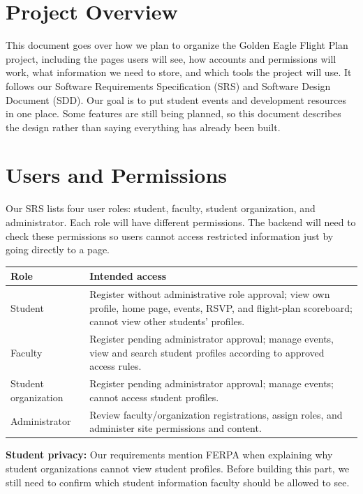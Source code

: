 \newcommand{\documentName}{Project Design Specification}
\newcommand{\shortDocumentName}{PDS}





\firstPageBlock

\newpage %
\section{Project Overview}
This document goes over how we plan to organize the Golden Eagle Flight Plan project, including the pages users will see, how accounts and permissions will work, what information we need to store, and which tools the project will use. It follows our Software Requirements Specification (SRS) and Software Design Document (SDD). Our goal is to put student events and development resources in one place. Some features are still being planned, so this document describes the design rather than saying everything has already been built.

\newpage %
\section{Users and Permissions}
Our SRS lists four user roles: student, faculty, student organization, and administrator. Each role will have different permissions. The backend will need to check these permissions so users cannot access restricted information just by going directly to a page.
\begin{longtable}{L{0.27\textwidth}L{0.63\textwidth}}
\toprule Role & Intended access \\ \midrule
Student & Register without administrative role approval; view own profile, home page, events, RSVP, and flight-plan scoreboard; cannot view other students' profiles.\\
Faculty & Register pending administrator approval; manage events, view and search student profiles according to approved access rules.\\
Student organization & Register pending administrator approval; manage events; cannot access student profiles.\\
Administrator & Review faculty/organization registrations, assign roles, and administer site permissions and content.\\
\bottomrule
\end{longtable}
\noindent\textbf{Student privacy:} Our requirements mention FERPA when explaining why student organizations cannot view student profiles. Before building this part, we still need to confirm which student information faculty should be allowed to see.

